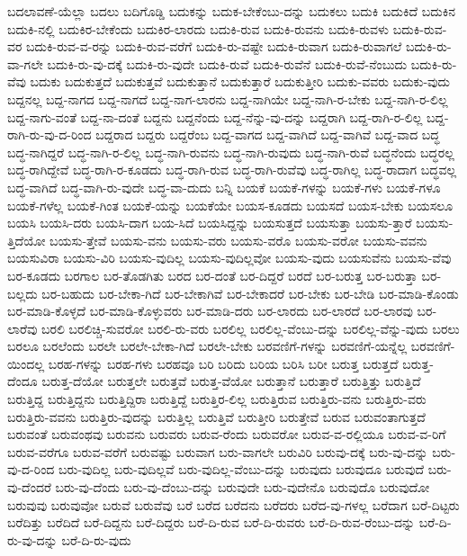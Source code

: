 {ಬದಲಾವಣೆ-ಯೆಲ್ಲಾ
ಬದಲು
ಬದಿಗೊಡ್ಡಿ
ಬದುಕನ್ನು
ಬದುಕ-ಬೇಕೆಂಬು-ದನ್ನು
ಬದುಕಲು
ಬದುಕಿ
ಬದುಕಿದೆ
ಬದುಕಿನ
ಬದುಕಿ-ನಲ್ಲಿ
ಬದುಕಿರ-ಬೇಕೆಂದು
ಬದುಕಿರ-ಲಾರದು
ಬದುಕಿ-ರುವ
ಬದುಕಿ-ರುವನು
ಬದುಕಿ-ರುವಳು
ಬದುಕಿ-ರುವ-ವರ
ಬದುಕಿ-ರುವ-ವ-ರನ್ನು
ಬದುಕಿ-ರುವ-ವರೆಗೆ
ಬದುಕಿ-ರು-ವಷ್ಟೇ
ಬದುಕಿ-ರುವಾಗ
ಬದುಕಿ-ರುವಾಗಲೆ
ಬದುಕಿ-ರು-ವಾ-ಗಲೇ
ಬದುಕಿ-ರು-ವು-ದಕ್ಕೆ
ಬದುಕಿ-ರು-ವುದೇ
ಬದುಕಿ-ರುವೆ
ಬದುಕಿ-ರುವೆನೆ
ಬದುಕಿ-ರುವೆ-ನೆಂಬುದು
ಬದುಕಿ-ರು-ವೆವು
ಬದುಕು
ಬದುಕುತ್ತದೆ
ಬದುಕುತ್ತವೆ
ಬದುಕುತ್ತಾನೆ
ಬದುಕುತ್ತಾರೆ
ಬದುಕುತ್ತೀರಿ
ಬದುಕು-ವವರು
ಬದುಕು-ವುದು
ಬದ್ದನಲ್ಲ
ಬದ್ದ-ನಾಗದ
ಬದ್ದ-ನಾಗದೆ
ಬದ್ದ-ನಾಗ-ಲಾರನು
ಬದ್ದ-ನಾಗಿಯೇ
ಬದ್ದ-ನಾಗಿ-ರ-ಬೇಕು
ಬದ್ದ-ನಾಗಿ-ರ-ಲಿಲ್ಲ
ಬದ್ದ-ನಾಗು-ವಂತೆ
ಬದ್ದ-ನಾ-ದಂತೆ
ಬದ್ದನು
ಬದ್ದನೆಂದು
ಬದ್ದ-ನೆನ್ನು-ವು-ದನ್ನು
ಬದ್ದರಾಗಿ
ಬದ್ದ-ರಾಗಿ-ರ-ಲಿಲ್ಲ
ಬದ್ದ-ರಾಗಿ-ರು-ವು-ದ-ರಿಂದ
ಬದ್ದರಾದ
ಬದ್ದರು
ಬದ್ದರೆಂಬ
ಬದ್ದ-ವಾಗದ
ಬದ್ದ-ವಾಗಿದೆ
ಬದ್ದ-ವಾಗಿವೆ
ಬದ್ದ-ವಾದ
ಬದ್ಧ
ಬದ್ಧ-ನಾಗಿದ್ದರೆ
ಬದ್ಧ-ನಾಗಿ-ರ-ಲಿಲ್ಲ
ಬದ್ಧ-ನಾಗಿ-ರುವನು
ಬದ್ಧ-ನಾಗಿ-ರುವುದು
ಬದ್ಧ-ನಾಗಿ-ರುವೆ
ಬದ್ಧನೆಂದು
ಬದ್ಧರಲ್ಲ
ಬದ್ಧ-ರಾಗಿದ್ದೇವೆ
ಬದ್ಧ-ರಾಗಿ-ರ-ಕೂಡದು
ಬದ್ಧ-ರಾಗಿ-ರುವ
ಬದ್ಧ-ರಾಗಿ-ರುವೆವು
ಬದ್ಧ-ರಾಗಿಲ್ಲ
ಬದ್ಧ-ರಾದಾಗ
ಬದ್ಧವಲ್ಲ
ಬದ್ಧ-ವಾಗಿದೆ
ಬದ್ಧ-ವಾಗಿ-ರು-ವುದೇ
ಬದ್ಧ-ವಾ-ದುದು
ಬನ್ನಿ
ಬಯಕೆ
ಬಯಕೆ-ಗಳನ್ನು
ಬಯಕೆ-ಗಳು
ಬಯಕೆ-ಗಳೂ
ಬಯಕೆ-ಗಳೆಲ್ಲ
ಬಯಕೆ-ಗಿಂತ
ಬಯಕೆ-ಯನ್ನು
ಬಯಕೆಯೇ
ಬಯಸ-ಕೂಡದು
ಬಯಸದೆ
ಬಯಸ-ಬೇಕು
ಬಯಸಲೂ
ಬಯಸಿ
ಬಯಸಿ-ದರು
ಬಯಸಿ-ದಾಗ
ಬಯ-ಸಿದೆ
ಬಯಸಿದ್ದನ್ನು
ಬಯಸುತ್ತದೆ
ಬಯಸುತ್ತಾ
ಬಯಸು-ತ್ತಾರೆ
ಬಯಸು-ತ್ತಿದೆಯೋ
ಬಯಸು-ತ್ತೇವೆ
ಬಯಸು-ವನು
ಬಯಸು-ವರು
ಬಯಸು-ವರೊ
ಬಯಸು-ವರೋ
ಬಯಸು-ವವನು
ಬಯಸುವಿರಾ
ಬಯಸು-ವಿರಿ
ಬಯಸು-ವುದಿಲ್ಲ
ಬಯಸು-ವುದಿಲ್ಲವೋ
ಬಯಸು-ವುದು
ಬಯಸುವೆನು
ಬಯಸು-ವೆವು
ಬರ-ಕೂಡದು
ಬರಗಾಲ
ಬರ-ತೊಡಗಿತು
ಬರದ
ಬರ-ದಂತೆ
ಬರ-ದಿದ್ದರೆ
ಬರದೆ
ಬರ-ಬರುತ್ತ
ಬರ-ಬರುತ್ತಾ
ಬರ-ಬಲ್ಲದು
ಬರ-ಬಹುದು
ಬರ-ಬೇಕಾ-ಗಿದೆ
ಬರ-ಬೇಕಾಗಿವೆ
ಬರ-ಬೇಕಾದರೆ
ಬರ-ಬೇಕು
ಬರ-ಬೇಡಿ
ಬರ-ಮಾಡಿ-ಕೊಂಡು
ಬರ-ಮಾಡಿ-ಕೊಳ್ಳದೆ
ಬರ-ಮಾಡಿ-ಕೊಳ್ಳುವರು
ಬರ-ಮಾಡಿ-ದರು
ಬರ-ಲಾರದು
ಬರ-ಲಾರದೆ
ಬರ-ಲಾರವು
ಬರ-ಲಾರೆವು
ಬರಲಿ
ಬರಲಿಚ್ಚಿ-ಸುವರೋ
ಬರಲಿ-ರು-ವರು
ಬರಲಿಲ್ಲ
ಬರಲಿಲ್ಲ-ವೆಂಬು-ದನ್ನು
ಬರಲಿಲ್ಲ-ವೆನ್ನು-ವುದು
ಬರಲು
ಬರಲೂ
ಬರಲೆಂದು
ಬರಲೇ
ಬರಲೇ-ಬೇಕಾ-ಗಿದೆ
ಬರಲೇ-ಬೇಕು
ಬರವಣಿಗೆ-ಗಳನ್ನು
ಬರವಣಿಗೆ-ಯನ್ನೆಲ್ಲ
ಬರವಣಿಗೆ-ಯಿಂದಲ್ಲ
ಬರಹ-ಗಳನ್ನು
ಬರಹ-ಗಳು
ಬರಹವೂ
ಬರಿ
ಬರಿದು
ಬರಿಯ
ಬರಿಸಿ
ಬರೀ
ಬರುತ್ತ
ಬರುತ್ತದೆ
ಬರುತ್ತ-ದೆಂದೂ
ಬರುತ್ತ-ದೆಯೋ
ಬರುತ್ತಲೇ
ಬರುತ್ತವೆ
ಬರುತ್ತ-ವೆಯೋ
ಬರುತ್ತಾನೆ
ಬರುತ್ತಾರೆ
ಬರುತ್ತಿತ್ತು
ಬರುತ್ತಿದೆ
ಬರುತ್ತಿದ್ದ
ಬರುತ್ತಿದ್ದನು
ಬರುತ್ತಿದ್ದಿರಾ
ಬರುತ್ತಿದ್ದೆ
ಬರುತ್ತಿರ-ಲಿಲ್ಲ
ಬರುತ್ತಿರುವ
ಬರುತ್ತಿರು-ವನು
ಬರುತ್ತಿರು-ವರು
ಬರುತ್ತಿರು-ವವನು
ಬರುತ್ತಿರು-ವುದನ್ನು
ಬರುತ್ತಿಲ್ಲ
ಬರುತ್ತಿವೆ
ಬರುತ್ತೀರಿ
ಬರುತ್ತೇವೆ
ಬರುವ
ಬರುವಂತಾಗುತ್ತದೆ
ಬರುವಂತೆ
ಬರುವಂಥವು
ಬರುವನು
ಬರುವರು
ಬರುವ-ರೆಂದು
ಬರುವರೋ
ಬರುವ-ವ-ರಲ್ಲಿಯೂ
ಬರುವ-ವ-ರಿಗೆ
ಬರುವ-ವರೆಗೂ
ಬರುವ-ವರೆಗೆ
ಬರುವಷ್ಟು
ಬರುವಾಗ
ಬರು-ವಾಗಲೇ
ಬರುವಿರಿ
ಬರುವು-ದಕ್ಕೆ
ಬರು-ವು-ದನ್ನು
ಬರು-ವು-ದ-ರಿಂದ
ಬರು-ವುದಿಲ್ಲ
ಬರು-ವುದಿಲ್ಲವೆ
ಬರು-ವುದಿಲ್ಲ-ವೆಂಬು-ದನ್ನು
ಬರುವುದು
ಬರುವುದೂ
ಬರುವುದೆ
ಬರು-ವು-ದೆಂದರೆ
ಬರು-ವು-ದೆಂದು
ಬರು-ವು-ದೆಂಬು-ದನ್ನು
ಬರುವುದೇ
ಬರು-ವುದೇನೊ
ಬರುವುದೊ
ಬರುವುದೋ
ಬರುವುವು
ಬರುವುವೋ
ಬರುವೆ
ಬರುವೆವು
ಬರೆ
ಬರೆದ
ಬರೆದನು
ಬರೆದರು
ಬರೆದ-ವು-ಗಳಲ್ಲ
ಬರೆದಾಗ
ಬರೆ-ದಿಟ್ಟರು
ಬರೆದಿತ್ತು
ಬರೆದಿದೆ
ಬರೆ-ದಿದ್ದನು
ಬರೆ-ದಿದ್ದರು
ಬರೆ-ದಿ-ರುವ
ಬರೆ-ದಿ-ರುವರು
ಬರೆ-ದಿ-ರುವ-ರೆಂಬು-ದನ್ನು
ಬರೆ-ದಿ-ರು-ವು-ದನ್ನು
ಬರೆ-ದಿ-ರು-ವುದು
}
